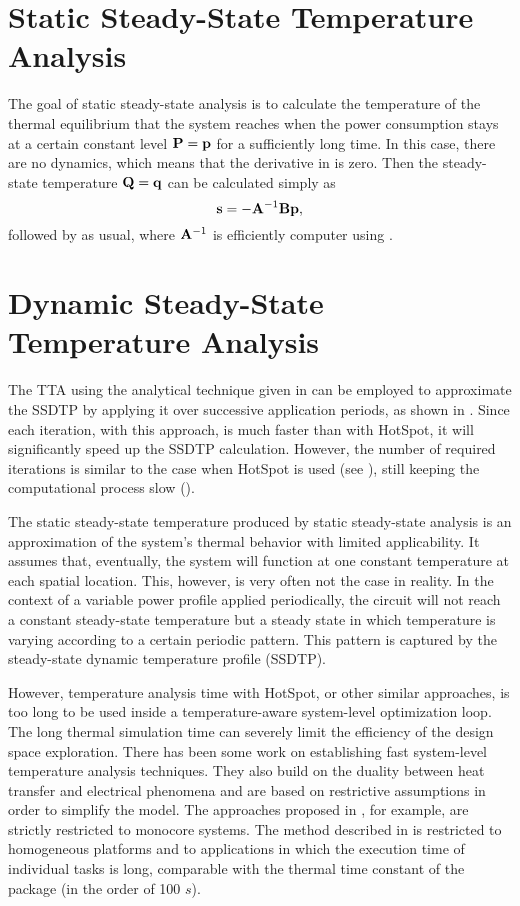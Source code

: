 \section{Static Steady-State Temperature Analysis}

The goal of static steady-state analysis is to calculate the temperature of the
thermal equilibrium that the system reaches when the power consumption stays at
a certain constant level $\mathbf{P} = \mathbf{p}$ for a sufficiently long time. In this case,
there are no dynamics, which means that the derivative in
 is zero. Then the steady-state temperature $\mathbf{Q}
= \mathbf{q}$ can be calculated simply as
\[
  \mathbf{s} = -\mathbf{A}^{-1} \mathbf{B} \mathbf{p},
\]
followed by  as usual, where $\mathbf{A}^{-1}$ is
efficiently computer using .

\section{Dynamic Steady-State Temperature Analysis}

The TTA using the analytical technique given in  can
be employed to approximate the SSDTP by applying it over successive application
periods, as shown in . Since each iteration,
with this approach, is much faster than with HotSpot, it will significantly
speed up the SSDTP calculation. However, the number of required iterations is
similar to the case when HotSpot is used (see ), still
keeping the computational process slow ().

The static steady-state temperature produced by static steady-state analysis is
an approximation of the system's thermal behavior with limited applicability. It
assumes that, eventually, the system will function at one constant temperature
at each spatial location. This, however, is very often not the case in reality.
In the context of a variable power profile applied periodically, the circuit
will not reach a constant steady-state temperature but a steady state in which
temperature is varying according to a certain periodic pattern. This pattern is
captured by the steady-state dynamic temperature profile (SSDTP).

However, temperature analysis time with HotSpot, or other similar approaches, is
too long to be used inside a temperature-aware system-level optimization loop.
The long thermal simulation time can severely limit the efficiency of the design
space exploration. There has been some work on establishing fast system-level
temperature analysis techniques. They also build on the duality between heat
transfer and electrical phenomena and are based on restrictive assumptions in
order to simplify the model. The approaches proposed in \cite{rai2011, bao2010},
for example, are strictly restricted to monocore systems. The method described
in \cite{rao2009} is restricted to homogeneous platforms and to applications in
which the execution time of individual tasks is long, comparable with the
thermal time constant of the package (in the order of 100 $s$).

